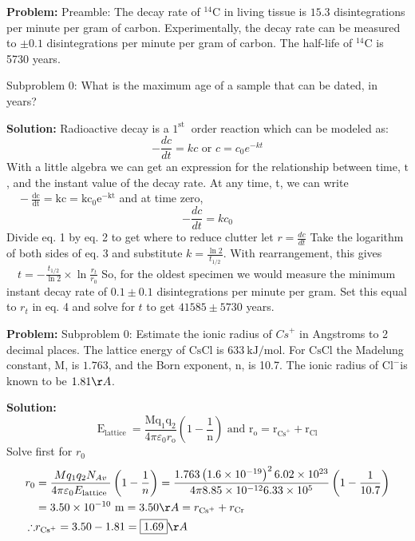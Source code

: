\documentclass[10pt]{article}
\begin{document}
\textbf{Problem:}
Preamble: The decay rate of ${ }^{14} \mathrm{C}$ in living tissue is $15.3$ disintegrations per minute per gram of carbon. Experimentally, the decay rate can be measured to $\pm 0.1$ disintegrations per minute per gram of carbon. The half-life of ${ }^{14} \mathrm{C}$ is 5730 years.

Subproblem 0: What is the maximum age of a sample that can be dated, in years?


\textbf{Solution:}
Radioactive decay is a $1^{\text {st }}$ order reaction which can be modeled as:
\[
-\frac{d c}{d t}=k c \text { or } c=c_{0} e^{-k t}
\]
With a little algebra we can get an expression for the relationship between time, $\mathrm{t}$, and the instant value of the decay rate.
At any time, t, we can write $\quad-\frac{\mathrm{dc}}{\mathrm{dt}}=\mathrm{kc}=\mathrm{kc}_{0} \mathrm{e}^{-\mathrm{kt}}$
and at time zero,
\[
-\frac{d c}{d t}=k c_{0}
\]
Divide eq. 1 by eq. 2 to get
where to reduce clutter let $r=\frac{d c}{d t}$
Take the logarithm of both sides of eq. 3 and substitute $k=\frac{\ln 2}{t_{1 / 2}}$.
With rearrangement, this gives $\quad t=-\frac{t_{1 / 2}}{\ln 2} \times \ln \frac{r_{t}}{r_{0}}$
So, for the oldest specimen we would measure the minimum instant decay rate of $0.1 \pm 0.1$ disintegrations per minute per gram. Set this equal to $r_{t}$ in eq. 4 and solve for $t$ to get $\boxed{41585} \pm 5730$ years.


\textbf{Problem:}
Subproblem 0: Estimate the ionic radius of ${Cs}^{+}$ in Angstroms to 2 decimal places. The lattice energy of $\mathrm{CsCl}$ is $633 \mathrm{~kJ} / \mathrm{mol}$. For $\mathrm{CsCl}$ the Madelung constant, $\mathrm{M}$, is $1.763$, and the Born exponent, $\mathrm{n}$, is 10.7. The ionic radius of $\mathrm{Cl}^{-}$is known to be $1.81 \AA$.


\textbf{Solution:}
\[
\mathrm{E}_{\text {lattice }}=\frac{\mathrm{Mq}_{1} \mathrm{q}_{2}}{4 \pi \varepsilon_{0} r_{\mathrm{o}}}\left(1-\frac{1}{\mathrm{n}}\right) \text { and } \mathrm{r}_{\mathrm{o}}=\mathrm{r}_{\mathrm{Cs}^{+}}+\mathrm{r}_{\mathrm{Cl}}
\]
Solve first for $r_{0}$
\[
\begin{aligned}
r_{0} &=\frac{M q_{1} q_{2} N_{A v}}{4 \pi \varepsilon_{0} E_{\text {lattice }}}\left(1-\frac{1}{n}\right)=\frac{1.763\left(1.6 \times 10^{-19}\right)^{2} 6.02 \times 10^{23}}{4 \pi 8.85 \times 10^{-12} 6.33 \times 10^{5}}\left(1-\frac{1}{10.7}\right) \\
&=3.50 \times 10^{-10} \mathrm{~m}=3.50 \AA=r_{\mathrm{Cs}^{+}}+r_{\mathrm{Cr}} \\
\therefore & r_{\mathrm{Cs}^{+}}=3.50-1.81=\boxed{1.69} \AA
\end{aligned}
\]
\end{document}
